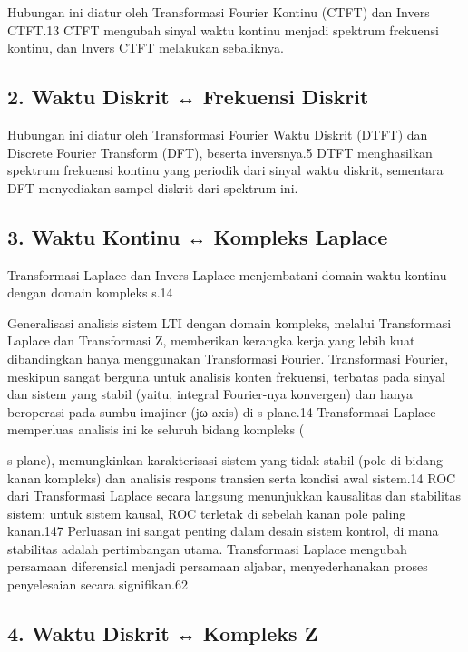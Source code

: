 \documentclass[
  letterpaper,
  DIV=11,
  numbers=noendperiod]{scrreprt}
\begin{document}
Hubungan ini diatur oleh Transformasi Fourier Kontinu (CTFT) dan Invers
CTFT.13 CTFT mengubah sinyal waktu kontinu menjadi spektrum frekuensi
kontinu, dan Invers CTFT melakukan sebaliknya.

\subsection{2. Waktu Diskrit ↔ Frekuensi
Diskrit}\label{waktu-diskrit-frekuensi-diskrit}

Hubungan ini diatur oleh Transformasi Fourier Waktu Diskrit (DTFT) dan
Discrete Fourier Transform (DFT), beserta inversnya.5 DTFT menghasilkan
spektrum frekuensi kontinu yang periodik dari sinyal waktu diskrit,
sementara DFT menyediakan sampel diskrit dari spektrum ini.

\subsection{3. Waktu Kontinu ↔ Kompleks
Laplace}\label{waktu-kontinu-kompleks-laplace}

Transformasi Laplace dan Invers Laplace menjembatani domain waktu
kontinu dengan domain kompleks s.14

Generalisasi analisis sistem LTI dengan domain kompleks, melalui
Transformasi Laplace dan Transformasi Z, memberikan kerangka kerja yang
lebih kuat dibandingkan hanya menggunakan Transformasi Fourier.
Transformasi Fourier, meskipun sangat berguna untuk analisis konten
frekuensi, terbatas pada sinyal dan sistem yang stabil (yaitu, integral
Fourier-nya konvergen) dan hanya beroperasi pada sumbu imajiner
(jω-axis) di s-plane.14 Transformasi Laplace memperluas analisis ini ke
seluruh bidang kompleks (

s-plane), memungkinkan karakterisasi sistem yang tidak stabil (pole di
bidang kanan kompleks) dan analisis respons transien serta kondisi awal
sistem.14 ROC dari Transformasi Laplace secara langsung menunjukkan
kausalitas dan stabilitas sistem; untuk sistem kausal, ROC terletak di
sebelah kanan pole paling kanan.147 Perluasan ini sangat penting dalam
desain sistem kontrol, di mana stabilitas adalah pertimbangan utama.
Transformasi Laplace mengubah persamaan diferensial menjadi persamaan
aljabar, menyederhanakan proses penyelesaian secara signifikan.62

\subsection{4. Waktu Diskrit ↔ Kompleks
Z}\label{waktu-diskrit-kompleks-z}
\end{document}

